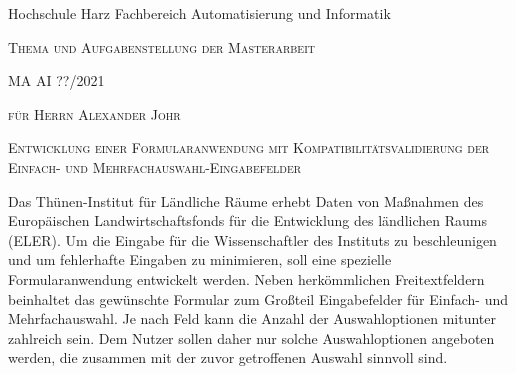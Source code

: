 
\newpage
\thispagestyle{empty}

Hochschule Harz\newline
Fachbereich Automatisierung und Informatik
\vfill
\begin{center}

\large{\textsc{Thema und Aufgabenstellung der Masterarbeit}}


\large{\textsc{MA AI ??/2021}}

\vfill

\large{\textsc{für Herrn Alexander Johr}}

\vfill


\large{\textsc{Entwicklung einer Formularanwendung mit Kompatibilitätsvalidierung der Einfach- und Mehrfachauswahl-Eingabefelder}}



\end{center}

\vfill





















Das Thünen-Institut für Ländliche Räume erhebt Daten von Maßnahmen
 des Europäischen
Landwirtschaftsfonds für die Entwicklung des ländlichen Raums
 (ELER).
Um die Eingabe für die Wissenschaftler des Instituts zu beschleunigen
 und um fehlerhafte Eingaben zu minimieren, soll eine 
 spezielle Formularanwendung entwickelt werden.
Neben herkömmlichen Freitextfeldern beinhaltet das gewünschte Formular zum Großteil Eingabefelder für Einfach- und Mehrfachauswahl.
Je nach Feld kann die Anzahl der Auswahloptionen mitunter zahlreich sein.
Dem Nutzer sollen daher nur solche Auswahloptionen angeboten werden,
die zusammen mit der zuvor getroffenen Auswahl sinnvoll sind.

